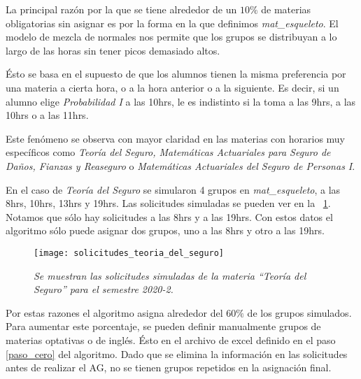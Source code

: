 La principal razón por la que se tiene alrededor de un $10\%$ de materias obligatorias sin asignar es por la forma en la que definimos \textit{mat\_esqueleto}. El modelo de mezcla de normales nos permite que los grupos se distribuyan a lo largo de las horas sin tener picos demasiado altos.

Ésto se basa en el supuesto de que los alumnos tienen la misma preferencia por una materia a cierta hora, o a la hora anterior o a la siguiente. Es decir, si un alumno elige \textit{Probabilidad I} a las 10hrs, le es indistinto si la toma a las 9hrs, a las 10hrs o a las 11hrs.

Este fenómeno se observa con mayor claridad en las materias con horarios muy específicos como \textit{Teoría del Seguro, Matemáticas Actuariales para Seguro de Daños, Fianzas y Reaseguro} o \textit{Matemáticas Actuariales del Seguro de Personas I}.

En el caso de \textit{Teoría del Seguro} se simularon 4 grupos en \textit{mat\_esqueleto}, a las 8hrs, 10hrs, 13hrs y 19hrs. Las solicitudes simuladas se pueden ver en la \figurename{~\ref{sol_TeoSeguro}}. Notamos que sólo hay solicitudes a las 8hrs y a las 19hrs. Con estos datos el algoritmo sólo puede asignar dos grupos, uno a las 8hrs y otro a las 19hrs.

\begin{figure}[H]
\centering
\texttt{[image: solicitudes\_teoria\_del\_seguro]} %
\caption[\textit{Solicitudes simuladas de la materia ``Teoría del Seguro'' para el semestre 2020-2}]{\textit{Se muestran las solicitudes simuladas de la materia ``Teoría del Seguro'' para el semestre 2020-2.}}\label{sol_TeoSeguro}
\end{figure}

Por estas razones el algoritmo asigna alrededor del $60\%$ de los grupos simulados. Para aumentar este porcentaje, se pueden definir manualmente grupos de materias optativas o de inglés. Ésto en el archivo de excel definido en el paso \ref{paso_cero} del algoritmo. Dado que se elimina la información en las solicitudes antes de realizar el AG, no se tienen grupos repetidos en la asignación final.

